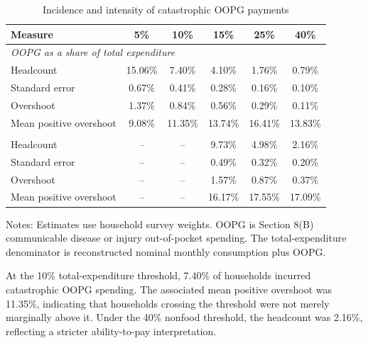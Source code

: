 \documentclass[11pt]{article}
\begin{document}
\begin{table}[!htbp]
\centering
\begin{threeparttable}
\caption{Incidence and intensity of catastrophic OOPG payments}
\label{tab:incidence}
\small
\begin{tabular}{lccccc}
\toprule
Measure & 5\% & 10\% & 15\% & 25\% & 40\% \\
\midrule
\multicolumn{6}{l}{\textit{OOPG as a share of total expenditure}} \\
Headcount & 15.06\% & 7.40\% & 4.10\% & 1.76\% & 0.79\% \\
Standard error & 0.67\% & 0.41\% & 0.28\% & 0.16\% & 0.10\% \\
Overshoot & 1.37\% & 0.84\% & 0.56\% & 0.29\% & 0.11\% \\
Mean positive overshoot & 9.08\% & 11.35\% & 13.74\% & 16.41\% & 13.83\% \\
\addlinespace
\multicolumn{6}{l}{\textit{OOPG as a share of nonfood expenditure}} \\
Headcount & -- & -- & 9.73\% & 4.98\% & 2.16\% \\
Standard error & -- & -- & 0.49\% & 0.32\% & 0.20\% \\
Overshoot & -- & -- & 1.57\% & 0.87\% & 0.37\% \\
Mean positive overshoot & -- & -- & 16.17\% & 17.55\% & 17.09\% \\
\bottomrule
\end{tabular}
\begin{tablenotes}
\small
\item Notes: Estimates use household survey weights. OOPG is Section 8(B) communicable disease or injury out-of-pocket spending. The total-expenditure denominator is reconstructed nominal monthly consumption plus OOPG.
\end{tablenotes}
\end{threeparttable}
\end{table}

At the 10\% total-expenditure threshold, 7.40\% of households incurred catastrophic OOPG spending. The associated mean positive overshoot was 11.35\%, indicating that households crossing the threshold were not merely marginally above it. Under the 40\% nonfood threshold, the headcount was 2.16\%, reflecting a stricter ability-to-pay interpretation.
\end{document}
